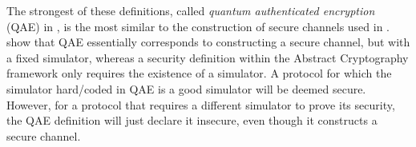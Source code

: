 The strongest of these definitions, called
\emph{quantum authenticated encryption} (QAE) in \cite{AGM18}, is the
most similar to the construction of secure channels used in
. \textcite{BMPZ19} show that QAE
essentially corresponds to constructing a secure channel, but with a
fixed simulator, whereas a security definition within the Abstract Cryptography
framework only requires the
existence of a simulator. A protocol for which the simulator
hard\-/coded in QAE is a good simulator will be deemed
secure. However, for a protocol that requires a different simulator to
prove its security, the QAE definition will just declare it insecure,
even though it constructs a secure channel.


